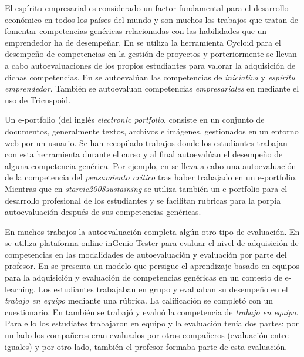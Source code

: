 El espíritu empresarial es considerado un factor fundamental para el desarrollo económico en todos los países del mundo \cite{DeXena2012educacion} y son muchos los trabajos que tratan de fomentar competencias genéricas relacionadas con las habilidades que un emprendedor ha de desempeñar. En \cite{chang2009international} se utiliza la herramienta Cycloid para el desempeño de competencias en la gestión de proyectos y porteriormente se llevan a cabo autoevaluaciones de los propios estudiantes para valorar la adquisición de dichas competencias. En \cite{marquez2010have} se autoevalúan las competencias de \emph{iniciativa} y \emph{espíritu emprendedor}. También se autoevaluan competencias \emph{empresariales} en  \cite{achcaoucaou2014competence} mediante el uso de Tricuspoid. 

Un e-portfolio (del inglés \emph{electronic portfolio}, consiste en un conjunto de documentos, generalmente textos, archivos e imágenes, gestionados en un entorno web por un usuario. Se han recopilado trabajos donde los estudiantes trabajan con esta herramienta durante el curso y al final autoevalúan el desempeño de alguna competencia genérica. Por ejemplo, en \cite{arno2011promoting} se lleva a cabo una autoevaluación de la competencia del \emph{pensamiento crítico} tras haber trabajado en un e-portfolio. Mientras que en \emph{starcic2008sustaining} se utiliza también un e-portfolio para el desarrollo profesional de los estudiantes y se facilitan rubricas para la porpia autoevaluación después de sus competencias genéricas.

En muchos trabajos la autoevaluación completa algún otro tipo de evaluación. En \cite{sevilla2012assessment} se utiliza plataforma online inGenio Tester para evaluar el nivel de adquisición de competencias en las modalidades de autoevaluación y evaluación por parte del profesor. En \cite{ficapal2015learning} se presenta un modelo que persigue el aprendizaje basado en equipos para la adquisición y evaluación de competencias genéricas en un contesto de e-learning. Los estudiantes trabajaban en grupo y evaluaban su desempeño en el \emph{trabajo en equipo} mediante una rúbrica. La calificación se completó con un cuestionario. En \cite{khamis2012measurement} también se trabajó y evaluó la competencia de \emph{trabajo en equipo}. Para ello los estudiates trabajaron en equipo y la evaluación tenía dos partes: por un lado los compañeros eran evaluados por otros compañeros (evaluación entre iguales) y por otro lado, también el profesor formaba parte de esta evaluación.

